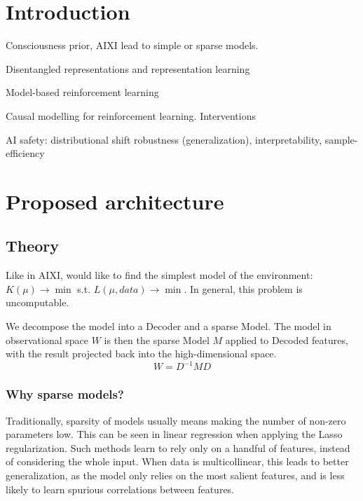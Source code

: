 \documentclass[a4paper,11pt,oneside]{report}
\begin{document}
\section{Introduction}
Consciousness prior, AIXI lead to simple or sparse models.

Disentangled representations and representation learning

Model-based reinforcement learning

Causal modelling for reinforcement learning. Interventions

AI safety: distributional shift robustness (generalization), interpretability, sample-efficiency

\section{Proposed architecture}
\subsection{Theory}
Like in AIXI, would like to find the simplest model of the environment:
$K(\mu)\to\min$ s.t. $L(\mu, data)\to\min$. In general, this problem is uncomputable.

We decompose the model into a Decoder and a sparse Model. The model in observational space $W$ is then the sparse Model $M$ applied to Decoded features, with the result projected back into the high-dimensional space.
$$
W=D^{-1}MD
$$

\subsubsection{Why sparse models?}
Traditionally, sparsity of models usually means making the number of non-zero parameters low. This can be seen in linear regression when applying the Lasso regularization. Such methods learn to rely only on a handful of features, instead of considering the whole input. When data is multicollinear, this leads to better generalization, as the model only relies on the most salient features, and is less likely to learn spurious correlations between features.
\end{document}
